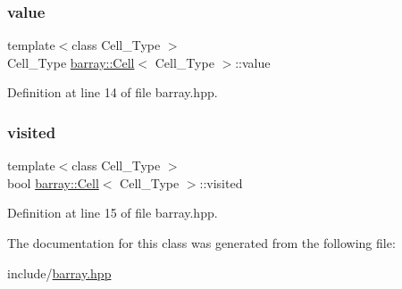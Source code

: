 \subsubsection{\texorpdfstring{value}{value}}
{\footnotesize\ttfamily template$<$class Cell\+\_\+\+Type $>$ \\
Cell\+\_\+\+Type \hyperlink{classbarray_1_1_cell}{barray\+::\+Cell}$<$ Cell\+\_\+\+Type $>$\+::value}



Definition at line 14 of file barray.\+hpp.

\mbox{\label{classbarray_1_1_cell_a95b2d8e3135ef4b9cad82221c449c168}} 
\subsubsection{\texorpdfstring{visited}{visited}}
{\footnotesize\ttfamily template$<$class Cell\+\_\+\+Type $>$ \\
bool \hyperlink{classbarray_1_1_cell}{barray\+::\+Cell}$<$ Cell\+\_\+\+Type $>$\+::visited}



Definition at line 15 of file barray.\+hpp.



The documentation for this class was generated from the following file\+:\begin{DoxyCompactItemize}
\item 
include/\hyperlink{barray_8hpp}{barray.\+hpp}\end{DoxyCompactItemize}
